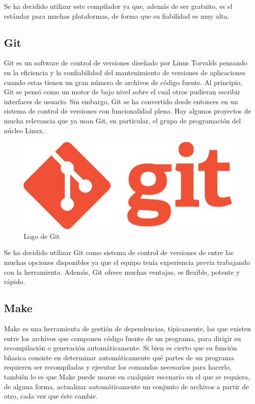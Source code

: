 		Se ha decidido utilizar este compilador ya que, además de ser gratuito, es el estándar para muchas plataformas, de forma que su fiabilidad es muy alta.

	\subsection{Git}

		Git es un software de control de versiones diseñado por Linus Torvalds pensando en la eficiencia y la confiabilidad del mantenimiento de versiones de aplicaciones cuando estas tienen un gran número de archivos de código fuente. Al principio, Git se pensó como un motor de bajo nivel sobre el cual otros pudieran escribir interfaces de usuario. Sin embargo, Git se ha convertido desde entonces en un sistema de control de versiones con funcionalidad plena. Hay algunos proyectos de mucha relevancia que ya usan Git, en particular, el grupo de programación del núcleo Linux.

		\begin{figure}[!htp]
			 \centering
			 \includegraphics{fig/git}
			 \caption{Logo de Git}
			 \label{fig:git}
		\end{figure}

		Se ha decidido utilizar Git como sistema de control de versiones de entre las muchas opciones disponibles ya que el equipo tenía experiencia previa trabajando con la herramienta. Además, Git ofrece muchas ventajas, es flexible, potente y rápido.

	\subsection{Make}

		Make es una herramienta de gestión de dependencias, típicamente, las que existen entre los archivos que componen código fuente de un programa, para dirigir su recompilación o generación automáticamente. Si bien es cierto que su función bñasica consiste en determinar automáticamente qué partes de un programa requieren ser recompiladas y ejecutar los comandos necesarios para hacerlo, también lo es que Make puede usarse en cualquier escenario en el que se requiera, de alguna forma, actualizar automáticamente un conjunto de archivos a partir de otro, cada vez que éste cambie.


